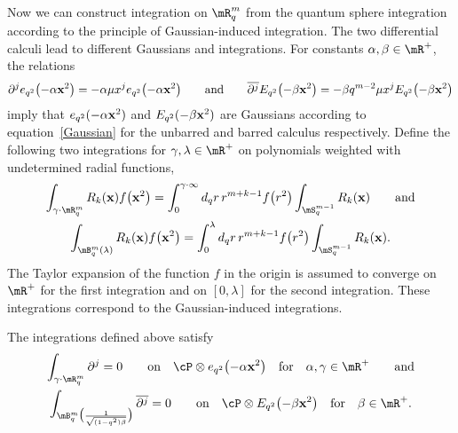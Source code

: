 Now we can construct integration on $\mR^m_q$ from the quantum sphere integration according to the principle of Gaussian-induced integration. The two dif\/ferential calculi lead to dif\/ferent Gaussians and integrations. For constants $\alpha,\beta\in\mR^+$, the relations
\begin{gather*}
\partial^je_{q^2}\big({-}\alpha\bold{x}^2\big)=-\alpha\mu x^je_{q^2}\big({-}\alpha\bold{x}^2\big)\qquad \mbox{and}\qquad \overline{\partial^j} E_{q^2}\big({-}\beta\bold{x}^2\big)=-\beta q^{m-2}\mu x^jE_{q^2}\big({-}\beta\bold{x}^2\big)
\end{gather*}
imply that $e_{q^2}(-\alpha\bold{x}^2)$ and $E_{q^2}(-\beta\bold{x}^2)$ are Gaussians according to equation~\eqref{Gaussian} for the unbarred and barred calculus respectively. Def\/ine the following two integrations for $\gamma,\lambda\in\mR^+$ on polynomials weighted with undetermined radial functions,
\begin{gather*}
\int_{\gamma\cdot\mR^m_q}R_{k}(\bold{x})f\big(\bold{x}^2\big) = \int_0^{\gamma\cdot\infty}d_qr\,r^{m+k-1}f\big(r^2\big)\int_{\mS^{m-1}_q}R_{k}(\bold{x})\qquad \mbox{and}\\
\int_{\mB^m_q(\lambda)}R_{k}(\bold{x})f\big(\bold{x}^2\big) = \int_0^{\lambda}d_qr\,r^{m+k-1}f\big(r^2\big)\int_{\mS^{m-1}_q}R_{k}(\bold{x}).
\end{gather*}
The Taylor expansion of the function $f$ in the origin is assumed to converge on $\mR^+$ for the f\/irst integration and on $[0,\lambda]$ for the second integration. These integrations correspond to the Gaussian-induced integrations.
\begin{theorem}
\label{2indint}
The integrations defined above satisfy
\begin{gather*}
\int_{\gamma\cdot\mR^m_q}\partial^j=0 \qquad \mbox{on}\quad  \cP\otimes e_{q^2}\big({-}\alpha\bold{x}^2\big)\quad \mbox{for}\quad \alpha,\gamma\in\mR^+\qquad\mbox{and}\\
\int_{\mB^m_q\big(\frac{1}{\sqrt{(1-q^2)\beta}}\big)}\overline{\partial^j}=0\qquad \mbox{on}\quad \cP\otimes E_{q^2}\big({-}\beta\bold{x}^2\big)\quad\mbox{for}\quad\beta\in\mR^+.
\end{gather*}
\end{theorem}
